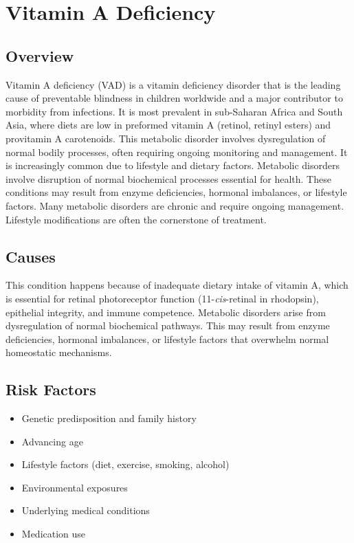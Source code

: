 \chapter{Vitamin A Deficiency}
\label{sec:Vitamin A Deficiency}

\section{Overview}
Vitamin A deficiency (VAD) is a vitamin deficiency disorder that is the leading cause of preventable blindness in children worldwide and a major contributor to morbidity from infections. It is most prevalent in sub-Saharan Africa and South Asia, where diets are low in preformed vitamin A (retinol, retinyl esters) and provitamin A carotenoids. This metabolic disorder involves dysregulation of normal bodily processes, often requiring ongoing monitoring and management. It is increasingly common due to lifestyle and dietary factors. Metabolic disorders involve disruption of normal biochemical processes essential for health. These conditions may result from enzyme deficiencies, hormonal imbalances, or lifestyle factors. Many metabolic disorders are chronic and require ongoing management. Lifestyle modifications are often the cornerstone of treatment.
\section{Causes}
This condition happens because of inadequate dietary intake of vitamin A, which is essential for retinal photoreceptor function (11-\emph{cis}-retinal in rhodopsin), epithelial integrity, and immune competence. Metabolic disorders arise from dysregulation of normal biochemical pathways. This may result from enzyme deficiencies, hormonal imbalances, or lifestyle factors that overwhelm normal homeostatic mechanisms.   
\section{Risk Factors}
\begin{itemize}[noitemsep]
  \item Genetic predisposition and family history
  \item Advancing age
  \item Lifestyle factors (diet, exercise, smoking, alcohol)
  \item Environmental exposures
  \item Underlying medical conditions
  \item Medication use
\end{itemize}
